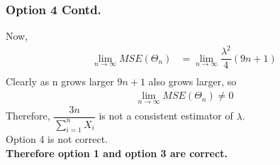 \documentclass{beamer}
\begin{document}
\begin{frame}
 \frametitle{Option 4 Contd.}
Now,
\begin{align}
     \lim_{n\to\infty} MSE( \Theta_n) &=    \lim_{n\to\infty} \dfrac{ \lambda^2}{4 } (9n+1) \\
\end{align}
Clearly as n grows larger $ 9n+1$ also grows larger, so
\begin{align}
     \lim_{n\to\infty} MSE( \Theta_n) \neq 0   
\end{align}
Therefore, $\dfrac{3n}{\sum_{i=1}^{n} X_i} $ is not a consistent estimator of $ \lambda$. \\
Option 4 is not correct. \\
\textbf{Therefore option 1 and option 3 are correct.}
\end{frame}
\end{document}
